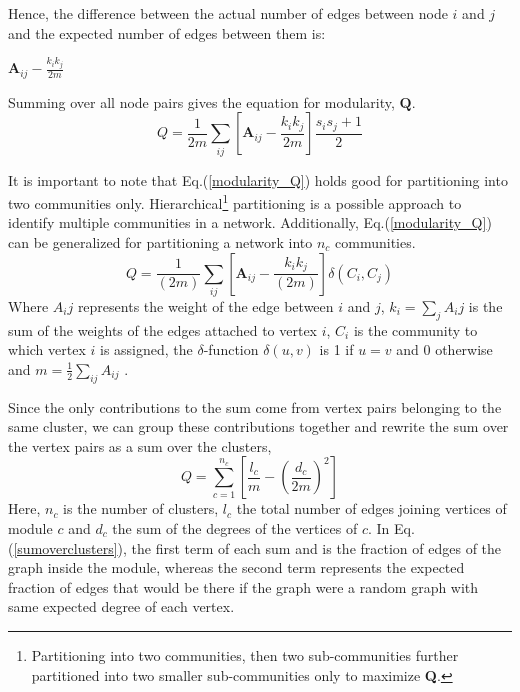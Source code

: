 Hence, the difference between the actual number of edges between node $i$ and $j$ and the expected number of edges between them is:

\begin{center}
	$\textbf{A}_{ij} - \frac{k_i k_j}{2m}$
\end{center}

Summing over all node pairs gives the equation for modularity, $\textbf{Q}$.
\begin{equation}\label{modularity_Q}
Q = \dfrac{1}{2m} \sum\limits_{ij}\left[\textbf{A}_{ij} - \dfrac{k_i k_j}{2m}\right] \dfrac{s_i s_j + 1}{2}
\end{equation}

It is important to note that Eq.(\ref{modularity_Q}) holds good for partitioning into two communities only. Hierarchical\footnote{Partitioning into two communities, then two sub-communities further partitioned into two smaller sub-communities only to maximize \textbf{Q}.} partitioning is a possible approach to identify multiple communities in a network. Additionally, Eq.(\ref{modularity_Q}) can be generalized for partitioning a network into $n_c$ communities.
\begin{equation}
Q = \dfrac{1}{(2m)} \sum\limits_{ij}\left[\textbf{A}_{ij} - \dfrac{k_i k_j}{(2m)}\right] \delta(C_i, C_j)
\end{equation}
Where $A_ij$ represents the weight of the edge between $i$ and $j$, $k_i = \sum_j A_ij$ is the sum of the weights of the edges attached to vertex $i$, $C_i$ is the community to which vertex $i$ is assigned, the $\delta$-function $\delta(u,v)$ is 1 if $u = v$ and 0 otherwise and $m = \frac{1}{2} \sum_{ij}A_{ij}$ \cite{ref-27}.
 
Since the only contributions to the sum come from vertex pairs belonging to the same cluster, we can group these contributions together and rewrite the sum over the vertex pairs as a sum over the clusters,
\begin{equation}\label{sumoverclusters}
Q = \sum\limits_{c=1}^{n_c} \left[ \dfrac{l_c}{m} - \left( \dfrac{d_c}{2m}\right)^2\right]
\end{equation}
Here, $n_c$ is the number of clusters, $l_c$ the total number of edges joining vertices of module $c$ and $d_c$ the sum of the degrees of the vertices of $c$. In Eq.(\ref{sumoverclusters}), the first term of each sum and is the fraction of edges of the graph inside the module, whereas the second term represents the expected fraction of edges that would be there if the graph were a random graph with same expected degree of each vertex.

